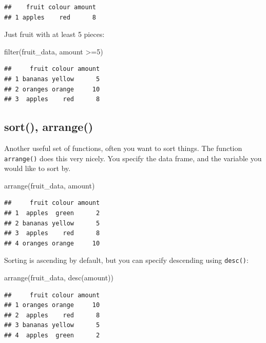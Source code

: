 \documentclass[
]{book}
\newenvironment{Shaded}{\begin{snugshade}}{\end{snugshade}}
\newcommand{\DecValTok}[1]{\textcolor[rgb]{0.00,0.00,0.81}{#1}}
\newcommand{\FunctionTok}[1]{\textcolor[rgb]{0.00,0.00,0.00}{#1}}
\newcommand{\NormalTok}[1]{#1}
\newcommand{\SpecialCharTok}[1]{\textcolor[rgb]{0.00,0.00,0.00}{#1}}
\begin{document}
\begin{verbatim}
##    fruit colour amount
## 1 apples    red      8
\end{verbatim}

Just fruit with at least 5 pieces:

\begin{Shaded}
\begin{Highlighting}[]
\FunctionTok{filter}\NormalTok{(fruit\_data, amount }\SpecialCharTok{\textgreater{}=}\DecValTok{5}\NormalTok{)}
\end{Highlighting}
\end{Shaded}

\begin{verbatim}
##     fruit colour amount
## 1 bananas yellow      5
## 2 oranges orange     10
## 3  apples    red      8
\end{verbatim}

\hypertarget{sort-arrange}{%
\subsection{sort(), arrange()}\label{sort-arrange}}

Another useful set of functions, often you want to sort things. The function \texttt{arrange()} does this very nicely. You specify the data frame, and the variable you would like to sort by.

\begin{Shaded}
\begin{Highlighting}[]
\FunctionTok{arrange}\NormalTok{(fruit\_data, amount)}
\end{Highlighting}
\end{Shaded}

\begin{verbatim}
##     fruit colour amount
## 1  apples  green      2
## 2 bananas yellow      5
## 3  apples    red      8
## 4 oranges orange     10
\end{verbatim}

Sorting is ascending by default, but you can specify descending using \texttt{desc()}:

\begin{Shaded}
\begin{Highlighting}[]
\FunctionTok{arrange}\NormalTok{(fruit\_data, }\FunctionTok{desc}\NormalTok{(amount))}
\end{Highlighting}
\end{Shaded}

\begin{verbatim}
##     fruit colour amount
## 1 oranges orange     10
## 2  apples    red      8
## 3 bananas yellow      5
## 4  apples  green      2
\end{verbatim}
\end{document}
